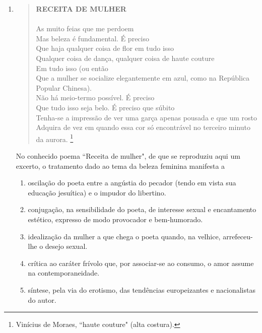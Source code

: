 \documentclass[10pt,a4paper]{article}
\begin{document}
\begin{multicols}{2}
\begin{enumerate}
	\item \begin{quote}
		\textbf{ RECEITA DE MULHER}\\
		\\
		As muito feias que me perdoem\\
		Mas beleza \'e fundamental. \'E preciso\\
		Que haja qualquer coisa de flor em tudo isso\\
		Qualquer coisa de dan\c{c}a, qualquer coisa de haute couture\\
		Em tudo isso (ou ent\~ao\\
		Que a mulher se socialize elegantemente em azul, como na Rep\'ublica Popular Chinesa).\\
		N\~ao h\'a meio-termo poss\'ivel. \'E preciso\\
		Que tudo isso seja belo. \'E preciso que s\'ubito\\
		Tenha-se a impress\~ao de ver uma gar\c{c}a apenas pousada e que um rosto\\
		Adquira de vez em quando essa cor s\'o encontr\'avel no terceiro minuto da aurora. \footnote{Vin\'icius de Moraes, ``haute couture" (alta costura).}\\
		\end{quote}
	No conhecido poema ``Receita de mulher", de que  se reproduziu aqui um excerto, o tratamento dado ao tema da beleza feminina manifesta a 

		\begin{enumerate}
		\item oscila\c{c}\~ao do poeta entre a ang\'ustia do pecador (tendo em vista sua educa\c{c}\~ao jesu\'itica) e o impudor do libertino. 
		\item conjuga\c{c}\~ao, na sensibilidade do poeta, de interesse sexual e encantamento est\'etico, expresso de modo provocador e bem-humorado.
		\item idealiza\c{c}\~ao da mulher a que chega o poeta quando, na velhice, arrefeceu-lhe o desejo sexual. 
		\item cr\'itica ao car\'ater fr\'ivolo que, por associar-se ao consumo, o amor assume na contemporaneidade. 
		\item s\'intese, pela via do erotismo, das tend\^encias europeizantes e nacionalistas do autor.
		\end{enumerate}


\end{enumerate}
\end{multicols}
\end{document}
